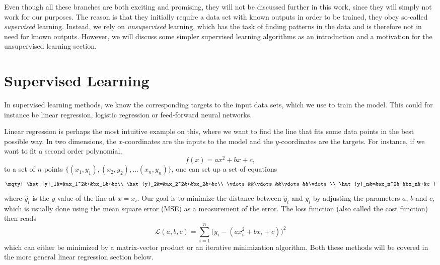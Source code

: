 Even though all these branches are both exciting and promising, they will not be discussed further in this work, since they will simply not work for our purposes. The reason is that they initially require a data set with known outputs in order to be trained, they obey so-called \textit{supervised} learning. Instead, we rely on \textit{unsupervised} learning, which has the task of finding patterns in the data and is therefore not in need for known outputs. However, we will discuss some simpler supervised learning algorithms as an introduction and a motivation for the unsupervised learning section. 

\section{Supervised Learning}
In supervised learning methods, we know the corresponding targets to the input data sets, which we use to train the model. This could for instance be linear regression, logistic regression or feed-forward neural networks.

Linear regression is perhaps the most intuitive example on this, where we want to find the line that fits some data points in the best possible way. In two dimensions, the $x$-coordinates are the inputs to the model and the $y$-coordinates are the targets. For instance, if we want to fit a second order polynomial,
\begin{equation}
f(x)=ax^2+bx+c,
\end{equation}
to a set of $n$ points $\{(x_1,y_1),(x_2,y_2),\hdots(x_n,y_n)\}$, one can set up a set of equations 
\begin{equation}
\mqty{
	\hat{y}_1&=&ax_1^2&+&bx_1&+&c\\
	\hat{y}_2&=&ax_2^2&+&bx_2&+&c\\
	\vdots&&\vdots&&\vdots&&\vdots\\
	\hat{y}_n&=&ax_n^2&+&bx_n&+&c
}
\label{eq:lineareqs}
\end{equation}
where $\hat{y}_i$ is the $y$-value of the line at $x=x_i$. Our goal is to minimize the distance between $\hat{y}_i$ and $y_i$ by adjusting the parameters $a$, $b$ and $c$, which is usually done using the mean square error (MSE) as a measurement of the error. The loss function (also called the cost function) then reads
\begin{equation}
\mathcal{L}(a,b,c)=\sum_{i=1}^{n}\Big(y_i-(ax_i^2+bx_i+c)\Big)^2
\end{equation}
which can either be minimized by a matrix-vector product or an iterative minimization algorithm. Both these methods will be covered in the more general linear regression section below.


